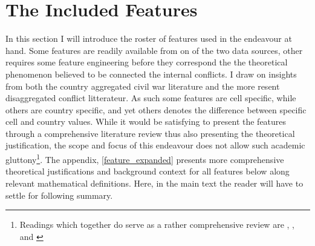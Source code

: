 \documentclass[a4paper]{article}
\begin{document}


\section{The Included Features}


In this section I will introduce the roster of features used in the endeavour at hand. Some features are readily available from on of the two data sources, other requires some feature engineering before they correspond the the theoretical phenomenon believed to be connected the internal conflicts. I draw on insights from both the country aggregated civil war literature and the more resent disaggregated conflict litterateur. As such some features are cell specific, while others are country specific, and yet others denotes the difference between specific cell and country values. While it would be satisfying to present the features through a comprehensive literature review thus also presenting the theoretical justification, the scope and focus of this endeavour does not allow such academic gluttony\footnote{Readings which together do serve as a rather comprehensive review are \cite{Hegre_Sambanis_2006}, \cite{Kalyvas_2007}, \cite{Cederman_Gleditsch_2009} and \cite{Blattman_Miguel_2010}}. The appendix, \autoref{feature_expanded} presents more comprehensive theoretical justifications and background context for all features below along relevant mathematical definitions. Here, in the main text the reader will have to settle for following summary.
\end{document}
